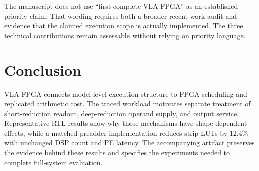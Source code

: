 \documentclass[10pt,conference,letterpaper]{IEEEtran}
\begin{document}
The manuscript does not use ``first complete VLA FPGA'' as an established priority claim. That wording requires both a broader recent-work audit and evidence that the claimed execution scope is actually implemented. The three technical contributions remain assessable without relying on priority language.

\section{Conclusion}
VLA-FPGA connects model-level execution structure to FPGA scheduling and replicated arithmetic cost. The traced workload motivates separate treatment of short-reduction readout, deep-reduction operand supply, and output service. Representative RTL results show why these mechanisms have shape-dependent effects, while a matched preadder implementation reduces strip LUTs by 12.4\% with unchanged DSP count and PE latency. The accompanying artifact preserves the evidence behind these results and specifies the experiments needed to complete full-system evaluation.



\end{document}
